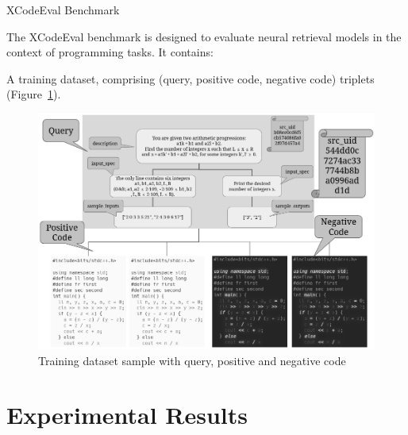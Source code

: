 \documentclass[12pt]{article}
\begin{document}






XCodeEval Benchmark

The XCodeEval benchmark is designed to evaluate neural retrieval models in the context of programming tasks. It contains:

    A training dataset, comprising (query, positive code, negative code) triplets (Figure~\ref{fig:training}).


\begin{figure}[ht]
\centering
\includegraphics[width=1.0\textwidth]{images/task-gray.png}
\caption{Training dataset sample with query, positive and negative code}
\label{fig:training}
\end{figure}



\section{Experimental Results}


\end{document}
